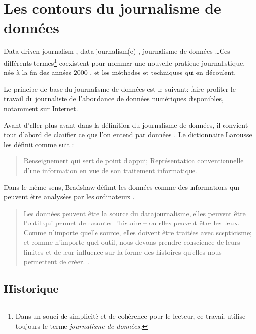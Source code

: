 
\chapter{Les contours du journalisme de données}


\og Data-driven journalism \fg, \og data journalism(e) \fg, \og journalisme de données \fg\dots Ces différents 
termes\footnote{Dans un souci de simplicité et de cohérence pour le lecteur, ce travail utilise toujours 
le terme \em journalisme de données\em.} 
coexistent pour nommer une nouvelle pratique journalistique, née à la fin des années 2000 \cite{bradshaw}, et les 
méthodes et techniques qui en découlent. 

Le principe de base du journalisme de données est le suivant: faire profiter le travail du journaliste 
de l'abondance de données numériques disponibles, notamment sur Internet. 

Avant d'aller plus avant dans la définition du journalisme de données, il convient tout d'abord de clarifier ce que l'on entend par \og données \fg.
Le dictionnaire Larousse les définit comme suit : 
\begin{quote}\og Renseignement qui sert de point d'appui; Représentation conventionnelle d'une information en vue de son traitement informatique.\fg \end{quote}

Dans le même sens, Bradshaw définit les données comme \og des informations qui peuvent être analysées par les ordinateurs \fg \cite{bradshaw}.


\begin{quote}
\og Les données peuvent être la source du datajournalisme, elles peuvent être l'outil qui permet de raconter l'histoire -- ou elles peuvent être les deux. 
Comme n'importe quelle source, elles doivent être traitées avec scepticisme; et comme n'importe quel outil, nous devons prendre conscience de leurs limites et de leur influence sur la forme des histoires qu'elles nous permettent de créer. \fg  %
\cite{handbookfr}.
\end{quote}








\section{Historique}

